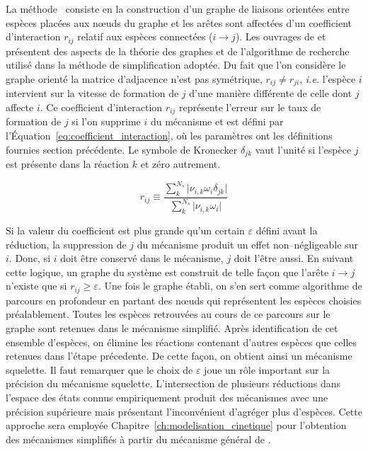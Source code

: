 La méthode~\cite{Lu2005} consiste en la construction d'un graphe de liaisons orientées entre espèces placées aux n{\oe}uds du graphe et les arêtes sont affectées d'un coefficient d'interaction $r_{ij}$ relatif aux espèces connectées ($i\rightarrow j$). Les ouvrages de \citet{Bondy1976} et \citet{Diestel2000} présentent des aspects de la théorie des graphes et de l'algorithme de recherche utilisé dans la méthode de simplification adoptée. Du fait que l'on considère le graphe orienté la matrice d'adjacence n'est pas symétrique, $r_{ij}\neq r_{ji}$, \textit{i.e.} l'espèce $i$ intervient sur la vitesse de formation de $j$ d'une manière différente de celle dont $j$ affecte $i$. Ce coefficient d'interaction $r_{ij}$ représente l'erreur sur le taux de formation de $j$ si l'on supprime $i$ du mécanisme et est défini par l'Équation~\ref{eq:coefficient_interaction}, où les paramètres ont les définitions fournies section précédente.  Le symbole de Kronecker $\delta_{jk}$ vaut l'unité si l'espèce $j$ est présente dans la réaction $k$ et zéro autrement.

\begin{equation}
  r_{ij}\equiv
  \dfrac{
   \sum_{k}^{N_{s}}\vert\nu_{i,k}\omega_{i}\delta_{jk}\vert}{
   \sum_{k}^{N_{s}}\vert\nu_{i,k}\omega_{i}\vert}
  \label{eq:coefficient_interaction}
\end{equation}

Si la valeur du coefficient est plus grande qu'un certain $\varepsilon$ défini avant la réduction, la suppression de $j$ du mécanisme produit un effet non--négligeable sur $i$. Donc, si $i$ doit être conservé dans le mécanisme, $j$ doit l'être aussi. En suivant cette logique, un graphe du système est construit de telle façon que l'arête $i\rightarrow j$ n'existe que si $r_{ij}\geq\varepsilon$. Une fois le graphe établi, on s'en sert comme algorithme de parcours en profondeur en partant des n{\oe}uds qui représentent les espèces choisies préalablement. Toutes les espèces retrouvées au cours de ce parcours sur le graphe sont retenues dans le mécanisme simplifié. Après identification de cet ensemble d'espèces, on élimine les réactions contenant d'autres espèces que celles retenues dans l'étape précedente. De cette façon, on obtient ainsi un mécanisme squelette. Il faut remarquer que le choix de $\varepsilon$ joue un rôle important sur la précision du mécanisme squelette. L'intersection de plusieurs réductions dans l'espace des états connus empiriquement produit des mécanismes avec une précision supérieure mais présentant l'inconvénient d'agréger plus d'espèces. Cette approche sera employée Chapitre~\ref{ch:modelisation_cinetique} pour l'obtention des mécanismes simplifiés à partir du mécanisme général de \citet{Norinaga2009}.

